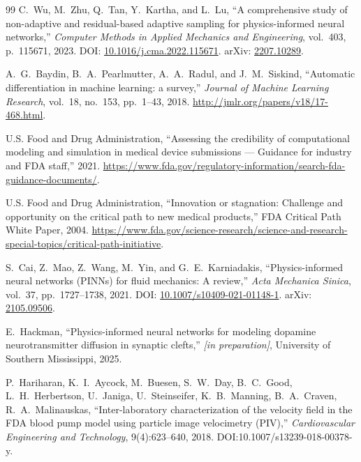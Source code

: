 \documentclass[12pt,a4paper]{article}
\begin{document}
\begin{thebibliography}{99}
C.~Wu, M.~Zhu, Q.~Tan, Y.~Kartha, and L.~Lu,
``A comprehensive study of non-adaptive and residual-based
adaptive sampling for physics-informed neural networks,''
\textit{Computer Methods in Applied Mechanics and Engineering},
vol.~403, p.~115671, 2023.
DOI: \href{https://doi.org/10.1016/j.cma.2022.115671}{10.1016/j.cma.2022.115671}.
arXiv: \href{https://arxiv.org/abs/2207.10289}{2207.10289}.

A.~G.~Baydin, B.~A.~Pearlmutter, A.~A.~Radul, and
J.~M.~Siskind,
``Automatic differentiation in machine learning: a survey,''
\textit{Journal of Machine Learning Research}, vol.~18,
no.~153, pp.~1--43, 2018.
\url{http://jmlr.org/papers/v18/17-468.html}.

U.S. Food and Drug Administration,
``Assessing the credibility of computational modeling and
simulation in medical device submissions --- Guidance for
industry and {FDA} staff,'' 2021.
\url{https://www.fda.gov/regulatory-information/search-fda-guidance-documents/}.

U.S. Food and Drug Administration,
``Innovation or stagnation: Challenge and opportunity on the
critical path to new medical products,''
FDA Critical Path White Paper, 2004.
\url{https://www.fda.gov/science-research/science-and-research-special-topics/critical-path-initiative}.

S.~Cai, Z.~Mao, Z.~Wang, M.~Yin, and G.~E.~Karniadakis,
``Physics-informed neural networks ({PINNs}) for fluid
mechanics: A review,''
\textit{Acta Mechanica Sinica}, vol.~37, pp.~1727--1738, 2021.
DOI: \href{https://doi.org/10.1007/s10409-021-01148-1}{10.1007/s10409-021-01148-1}.
arXiv: \href{https://arxiv.org/abs/2105.09506}{2105.09506}.

E.~Hackman,
``Physics-informed neural networks for modeling dopamine
neurotransmitter diffusion in synaptic clefts,''
\textit{[in preparation]}, University of Southern Mississippi,
2025.

P.~Hariharan, K.~I.~Aycock, M.~Buesen, S.~W.~Day, B.~C.~Good,
L.~H.~Herbertson, U.~Janiga, U.~Steinseifer, K.~B.~Manning,
B.~A.~Craven, R.~A.~Malinauskas,
``Inter-laboratory characterization of the velocity field in the
FDA blood pump model using particle image velocimetry (PIV),''
\textit{Cardiovascular Engineering and Technology}, 9(4):623--640,
2018. DOI:10.1007/s13239-018-00378-y.


\end{thebibliography}
\end{document}
